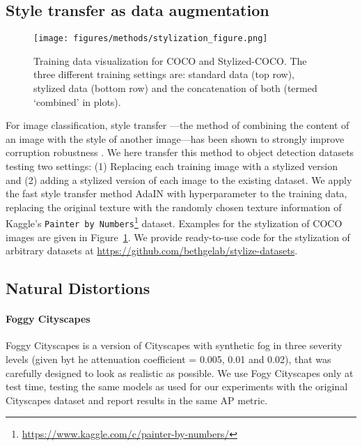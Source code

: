 \documentclass{article}
\begin{document}
\subsection{Style transfer as data augmentation}

\begin{figure}[t]
    \centering
    \texttt{[image: figures/methods/stylization\_figure.png]}
    \caption{Training data visualization for COCO and Stylized-COCO. The three different training settings are: standard data (top row), stylized data (bottom row) and the concatenation of both (termed `combined' in plots).}
    \label{fig:stylization}
    \vspace{-0.2cm}
\end{figure}

For image classification, style transfer \citep{gatys2016image}---the method of combining the content of an image with the style of another image---has been shown to strongly improve corruption robustness \citep{geirhos2019imagenettrained}. We here transfer this method to object detection datasets testing two settings: (1) Replacing each training image with a stylized version and (2) adding a stylized version of each image to the existing dataset. We apply the fast style transfer method AdaIN \citep{huang2017arbitrary} with hyperparameter \texttt{} to the training data, replacing the original texture with the randomly chosen texture information of Kaggle's \texttt{Painter by Numbers}\footnote{\url{https://www.kaggle.com/c/painter-by-numbers/}} dataset. Examples for the stylization of COCO images are given in Figure~\ref{fig:stylization}. We provide ready-to-use code for the stylization of arbitrary datasets at \url{https://github.com/bethgelab/stylize-datasets}.


\subsection{Natural Distortions}

\paragraph{Foggy Cityscapes}
Foggy Cityscapes \cite{Sakaridis18foggycityscapes} is a version of Cityscapes with synthetic fog in three severity levels (given byt he attenuation coefficient  = 0.005, 0.01 and 0.02), that was carefully designed to look as realistic as possible. 
We use Fogy Cityscapes only at test time, testing the same models as used for our experiments with the original Cityscapes dataset and report results in the same AP metric.
\end{document}
